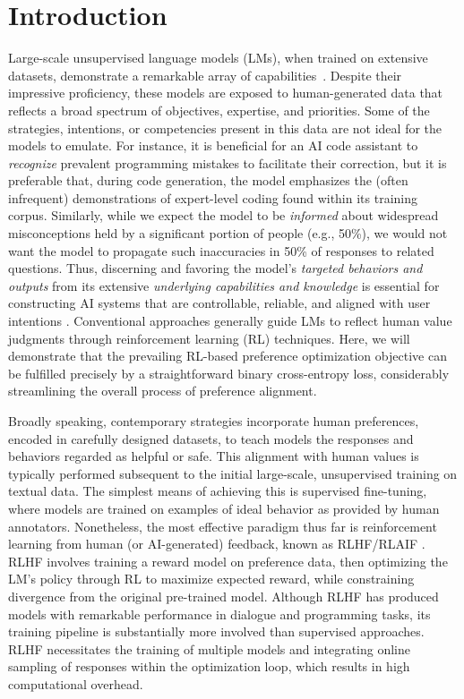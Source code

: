 \section{Introduction}
Large-scale unsupervised language models (LMs), when trained on extensive datasets, demonstrate a remarkable array of capabilities~\citep{chowdhery2022palm, brown2020language, touvron2023llama,bubeck2023sparks}. Despite their impressive proficiency, these models are exposed to human-generated data that reflects a broad spectrum of objectives, expertise, and priorities. Some of the strategies, intentions, or competencies present in this data are not ideal for the models to emulate. For instance, it is beneficial for an AI code assistant to \textit{recognize} prevalent programming mistakes to facilitate their correction, but it is preferable that, during code generation, the model emphasizes the (often infrequent) demonstrations of expert-level coding found within its training corpus. Similarly, while we expect the model to be \textit{informed} about widespread misconceptions held by a significant portion of people (e.g., 50\%), we would not want the model to propagate such inaccuracies in 50\% of responses to related questions. Thus, discerning and favoring the model’s \emph{targeted behaviors and outputs} from its extensive \textit{underlying capabilities and knowledge} is essential for constructing AI systems that are controllable, reliable, and aligned with user intentions \citep{ouyang2022training}. Conventional approaches generally guide LMs to reflect human value judgments through reinforcement learning (RL) techniques. Here, we will demonstrate that the prevailing RL-based preference optimization objective can be fulfilled precisely by a straightforward binary cross-entropy loss, considerably streamlining the overall process of preference alignment.

Broadly speaking, contemporary strategies incorporate human preferences, encoded in carefully designed datasets, to teach models the responses and behaviors regarded as helpful or safe. This alignment with human values is typically performed subsequent to the initial large-scale, unsupervised training on textual data. The simplest means of achieving this is supervised fine-tuning, where models are trained on examples of ideal behavior as provided by human annotators. Nonetheless, the most effective paradigm thus far is reinforcement learning from human (or AI-generated) feedback, known as RLHF/RLAIF \citep{christiano2017deep,bai2022constitutional}. RLHF involves training a reward model on preference data, then optimizing the LM’s policy through RL to maximize expected reward, while constraining divergence from the original pre-trained model. Although RLHF has produced models with remarkable performance in dialogue and programming tasks, its training pipeline is substantially more involved than supervised approaches. RLHF necessitates the training of multiple models and integrating online sampling of responses within the optimization loop, which results in high computational overhead.

